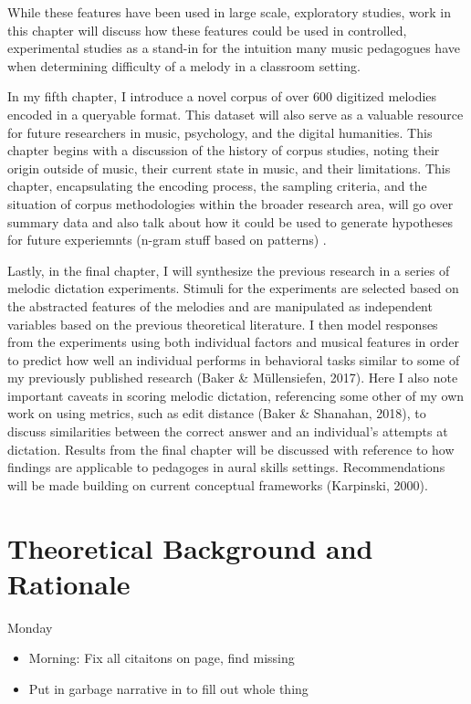 \documentclass[]{book}
\providecommand{\tightlist}{%
  \setlength{\itemsep}{0pt}\setlength{\parskip}{0pt}}
\theoremstyle{definition}
\theoremstyle{definition}
\theoremstyle{definition}
\theoremstyle{remark}
\begin{document}
While these features have been used in large scale, exploratory studies,
work in this chapter will discuss how these features could be used in
controlled, experimental studies as a stand-in for the intuition many
music pedagogues have when determining difficulty of a melody in a
classroom setting.

In my fifth chapter, I introduce a novel corpus of over 600 digitized
melodies encoded in a queryable format. This dataset will also serve as
a valuable resource for future researchers in music, psychology, and the
digital humanities. This chapter begins with a discussion of the history
of corpus studies, noting their origin outside of music, their current
state in music, and their limitations. This chapter, encapsulating the
encoding process, the sampling criteria, and the situation of corpus
methodologies within the broader research area, will go over summary
data and also talk about how it could be used to generate hypotheses for
future experiemnts (n-gram stuff based on patterns) .

Lastly, in the final chapter, I will synthesize the previous research in
a series of melodic dictation experiments. Stimuli for the experiments
are selected based on the abstracted features of the melodies and are
manipulated as independent variables based on the previous theoretical
literature. I then model responses from the experiments using both
individual factors and musical features in order to predict how well an
individual performs in behavioral tasks similar to some of my previously
published research (Baker \& Müllensiefen, 2017). Here I also note
important caveats in scoring melodic dictation, referencing some other
of my own work on using metrics, such as edit distance (Baker \&
Shanahan, 2018), to discuss similarities between the correct answer and
an individual's attempts at dictation. Results from the final chapter
will be discussed with reference to how findings are applicable to
pedagoges in aural skills settings. Recommendations will be made
building on current conceptual frameworks (Karpinski, 2000).

\hypertarget{intro}{%
\chapter{Theoretical Background and Rationale}\label{intro}}

Monday

\begin{itemize}
\tightlist
\item
  Morning: Fix all citaitons on page, find missing
\item
  Put in garbage narrative in to fill out whole thing
\end{itemize}
\end{document}
